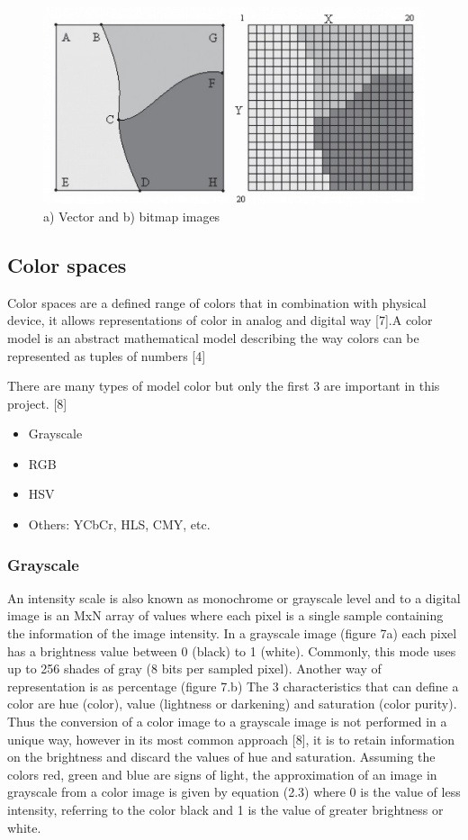\begin{figure}
  \includegraphics[width=\linewidth]{images/ch2/vectorAndBitmap.jpg}
  \caption{a) Vector and b) bitmap images}
  \label{fig:vectorAndBitmap}
\end{figure}

\subsection{Color spaces}
Color spaces are a defined range of colors that in combination with
physical device, it allows representations of color in analog and digital way [7].A color model is an abstract mathematical model describing the way colors can be represented as tuples of numbers [4]

There are many types of model color but only the first 3 are important in this project. [8]

\begin{itemize}
	\item Grayscale
	\item RGB
	\item HSV
	\item Others: YCbCr, HLS, CMY, etc.
\end{itemize}

\subsubsection{Grayscale}
An intensity scale is also known as monochrome or grayscale level and to a digital image is an MxN array of values where each pixel is a single sample containing the information of the image intensity.
In a grayscale image (figure 7a) each pixel has a brightness value between 0 (black) to 1 (white). Commonly, this mode uses up to 256 shades of gray (8 bits per sampled pixel). Another way of representation is as percentage (figure 7.b) The 3 characteristics that can define a color are hue (color), value (lightness or darkening) and saturation (color purity). Thus the conversion of a color image to a grayscale image is not performed in a unique way, however in its most common approach [8], it is to retain information on the brightness and discard the values of hue and saturation. Assuming the colors red, green and blue are signs of light, the approximation of an image in grayscale from a color image is given by equation (2.3) where 0 is the value of less intensity, referring to the color black and 1 is the value
of greater brightness or white.

